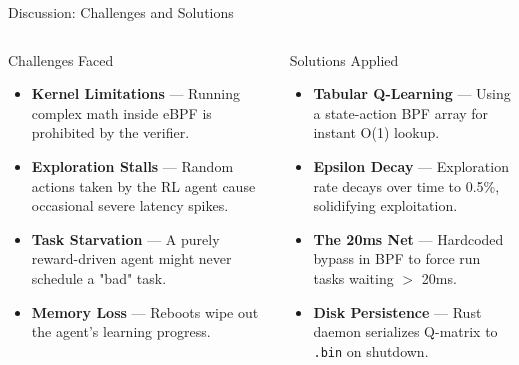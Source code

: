 \documentclass[aspectratio=169]{beamer}
\begin{document}
\begin{frame}{Discussion: Challenges and Solutions}
  \begin{columns}[T]
    \vspace{-6pt}
      \begin{alertblock}{Challenges Faced}
        \begin{itemize}\small\itemsep3pt
          \item \textbf{Kernel Limitations} — Running complex math inside eBPF is prohibited by the verifier.
          \item \textbf{Exploration Stalls} — Random actions taken by the RL agent cause occasional severe latency spikes.
          \item \textbf{Task Starvation} — A purely reward-driven agent might never schedule a "bad" task.
          \item \textbf{Memory Loss} — Reboots wipe out the agent's learning progress.
        \end{itemize}
      \end{alertblock}
      \begin{exampleblock}{Solutions Applied}
        \begin{itemize}\small\itemsep4pt
          \item \textbf{Tabular Q-Learning} — Using a state-action BPF array for instant O(1) lookup.
          \item \textbf{Epsilon Decay} — Exploration rate decays over time to 0.5\%, solidifying exploitation.
          \item \textbf{The 20ms Net} — Hardcoded bypass in BPF to force run tasks waiting $>$ 20ms.
          \item \textbf{Disk Persistence} — Rust daemon serializes Q-matrix to \texttt{.bin} on shutdown.
        \end{itemize}
      \end{exampleblock}
  \end{columns}
\end{frame}
\end{document}
